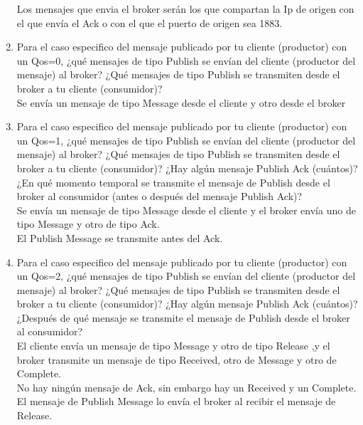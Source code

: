 \documentclass[12pt, a4paper]{report}
\begin{document}
\begin{enumerate}
	Los mensajes que envia el broker serán los que compartan la Ip de origen con el que envía el Ack o con el que el puerto de origen sea 1883.
	\item Para el caso especifico del mensaje publicado por tu cliente (productor) con un Qos=0, ¿qué
	mensajes de tipo Publish se envían del cliente (productor del mensaje) al broker? ¿Qué mensajes
	de tipo Publish se transmiten desde el broker a tu cliente (consumidor)?\\
	
	Se envía un mensaje de tipo Message desde el cliente y otro desde el broker
	\item Para el caso especifico del mensaje publicado por tu cliente (productor) con un Qos=1, ¿qué
	mensajes de tipo Publish se envían del cliente (productor del mensaje) al broker? ¿Qué mensajes
	de tipo Publish se transmiten desde el broker a tu cliente (consumidor)? ¿Hay algún mensaje
	Publish Ack (cuántos)? ¿En qué momento temporal se transmite el mensaje de Publish desde el
	broker al consumidor (antes o después del mensaje Publish Ack)?\\
	
	Se envía un mensaje de tipo Message desde el cliente y el broker envía uno de tipo Message y otro de tipo Ack.\\
	El Publish Message se transmite antes del Ack.
	\item Para el caso especifico del mensaje publicado por tu cliente (productor) con un Qos=2, ¿qué
	mensajes de tipo Publish se envían del cliente (productor del mensaje) al broker? ¿Qué mensajes
	de tipo Publish se transmiten desde el broker a tu cliente (consumidor)? ¿Hay algún mensaje
	Publish Ack (cuántos)? ¿Después de qué mensaje se transmite el mensaje de Publish desde el
	broker al consumidor?\\
	
	El cliente envía un mensaje de tipo Message y otro de tipo Release ,y el broker transmite un mensaje de tipo Received, otro de Message y otro de Complete.\\
	No hay ningún mensaje de Ack, sin embargo hay un Received y un Complete.\\
	El mensaje de Publish Message lo envía el broker al recibir el mensaje de Release.
\end{enumerate}
\end{document}
